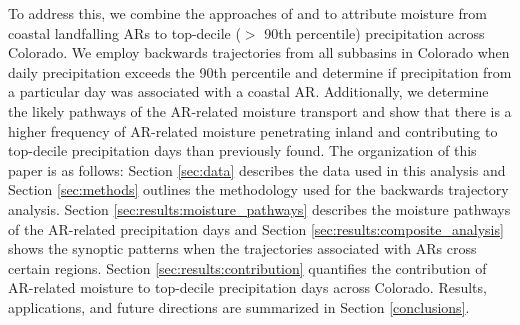 \documentclass[draft]{agujournal2019}
\begin{document}
To address this, we combine the approaches of  and  to attribute moisture from coastal landfalling ARs to top-decile ($>$ 90th percentile) precipitation across Colorado. We employ backwards trajectories from all subbasins in Colorado when daily precipitation exceeds the 90th percentile and determine if precipitation from a particular day was associated with a coastal AR. Additionally, we determine the likely pathways of the AR-related moisture transport and show that there is a higher frequency of AR-related moisture penetrating inland and contributing to top-decile precipitation days than previously found. The organization of this paper is as follows: Section \ref{sec:data} describes the data used in this analysis and Section \ref{sec:methods} outlines the methodology used for the backwards trajectory analysis. Section \ref{sec:results:moisture_pathways} describes the moisture pathways of the AR-related precipitation days and Section \ref{sec:results:composite_analysis} shows the synoptic patterns when the trajectories associated with ARs cross certain regions. Section \ref{sec:results:contribution} quantifies the contribution of AR-related moisture to top-decile precipitation days across Colorado. Results, applications, and future directions are summarized in Section \ref{conclusions}. 

\end{document}
